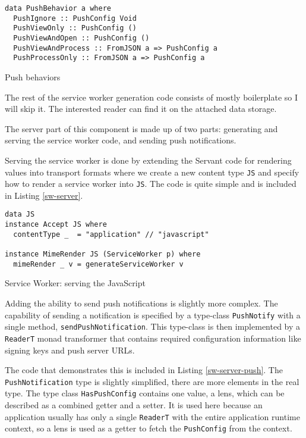 \documentclass[english,odsaz]{fitthesis}
\begin{document}
\begin{listing}[htbp]
\begin{verbatim}
data PushBehavior a where
  PushIgnore :: PushConfig Void
  PushViewOnly :: PushConfig ()
  PushViewAndOpen :: PushConfig ()
  PushViewAndProcess :: FromJSON a => PushConfig a
  PushProcessOnly :: FromJSON a => PushConfig a
\end{verbatim}
\caption{Push behaviors \label{push-behaviors}}
\end{listing}

The rest of the service worker generation code consists of mostly boilerplate so
I will skip it. The interested reader can find it on the attached data storage.

The server part of this component is made up of two parts: generating and
serving the service worker code, and sending push notifications.

Serving the service worker is done by extending the Servant code for rendering
values into transport formats where we create a new content type \texttt{JS} and specify
how to render a service worker into \texttt{JS}. The code is quite simple and is included in
Listing \ref{sw-server}.

\begin{listing}[htbp]
\begin{verbatim}
data JS
instance Accept JS where
  contentType _  = "application" // "javascript"

instance MimeRender JS (ServiceWorker p) where
  mimeRender _ v = generateServiceWorker v
\end{verbatim}
\caption{Service Worker: serving the JavaScript \label{sw-server}}
\end{listing}

Adding the ability to send push notifications is slightly more complex. The
capability of sending a notification is specified by a type-class \texttt{PushNotify}
with a single method, \texttt{sendPushNotification}. This type-class is then implemented
by a \texttt{ReaderT} monad transformer that contains required configuration information
like signing keys and push server URLs.

The code that demonstrates this is included in Listing \ref{sw-server-push}. The
\texttt{PushNotification} type is slightly simplified, there are more elements in the
real type. The type class \texttt{HasPushConfig} contains one value, a lens, which can be
described as a combined getter and a setter. It is used here because an
application usually has only a single \texttt{ReaderT} with the entire application
runtime context, so a lens is used as a getter to fetch the \texttt{PushConfig} from the
context.
\end{document}
